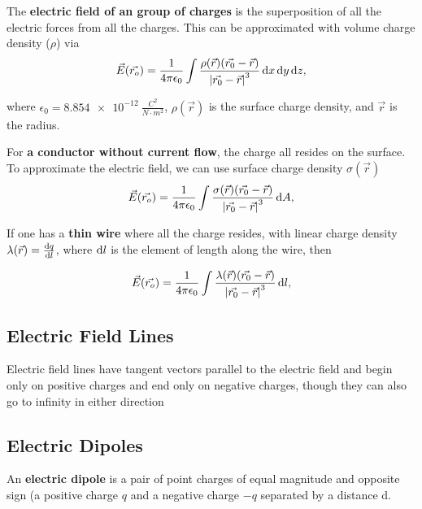 The \textbf{electric field of an group of charges} is the superposition of all the electric forces from all the charges. This can be approximated with volume charge density ($\rho$) via
\begin{equation}
\vec{E}(\vec{r_o}) = \frac{1}{4\pi \epsilon_0} \int\frac{\rho(\vec{r}) (\vec{r_0} - \vec{r})}{\left| \vec{r_0} - \vec{r} \right|^3} \operatorname{d\!} x \operatorname{d\!} y \operatorname{d\!} z,
\end{equation}

where $\epsilon_0 = \SI{8.854e-12}{\frac{C^2}{N \cdot m^2}}$, $\rho(\vec{r})$ is the surface charge density, and $\vec{r}$ is the radius.

For \textbf{a conductor without current flow}, the charge all resides on the surface. To approximate the electric field, we can use surface charge density $\sigma (\vec{r})$
\begin{equation}
\vec{E}(\vec{r_o}) = \frac{1}{4\pi \epsilon_0} \int\frac{\sigma(\vec{r}) (\vec{r_0} - \vec{r})}{\left| \vec{r_0} - \vec{r} \right|^3} \operatorname{d\!} A,
\end{equation}

If one has a \textbf{thin wire} where all the charge resides, with linear charge density $\lambda(\vec{r}) = \frac{\operatorname{d\!} q}{\operatorname{d\!} l}$, where $\operatorname{d\!} l$ is the element of length along the wire, then

\begin{equation}
\vec{E}(\vec{r_o}) = \frac{1}{4\pi \epsilon_0} \int\frac{\lambda(\vec{r}) (\vec{r_0} - \vec{r})}{\left| \vec{r_0} - \vec{r} \right|^3} \operatorname{d\!} l,
\end{equation}

\subsection{Electric Field Lines}
Electric field lines have tangent vectors parallel to the electric field and begin only on positive charges and end only on negative charges, though they can also go to infinity in either direction

\newpage
\subsection{Electric Dipoles}
An \textbf{electric dipole} is a pair of point charges of equal magnitude and opposite sign (a positive charge $q$ and a negative charge $-q$ separated by a distance d.

